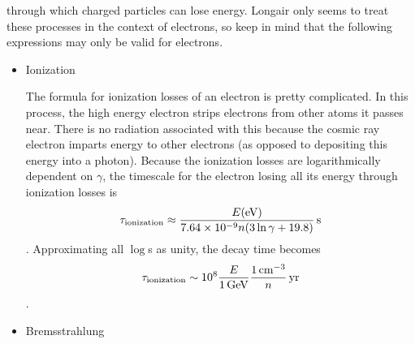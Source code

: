 \begin{enumerate}
       through which charged particles can lose energy.
      Longair only seems to treat these processes in the context of electrons, so keep in mind
      that the following expressions may only be valid for electrons.
      \begin{itemize}
      \item Ionization

            The formula for ionization losses of an electron is pretty complicated.  In this process, the high energy electron strips electrons from other atoms it passes
            near.  There is no radiation associated with this because the cosmic ray electron
            imparts energy to other electrons (as opposed to depositing this energy into
            a photon).  Because the ionization losses are logarithmically dependent on $\gamma$,
            the timescale for the electron losing all its energy through ionization losses is
            \begin{dmath}
                \tau_{\rm ionization} \approx \frac{E(\rm eV)}{7.64\times10^{-9}n(3\ln\gamma+19.8)}\,{\rm s}
            \end{dmath}.
            Approximating all $\log$s as unity, the decay time becomes
            \begin{dmath}
                \tau_{\rm ionization} \sim 10^8 \frac{E}{1\,{\rm GeV}}\frac{1\,{\rm cm}^{-3}}{n}\,{\rm yr}
            \end{dmath}.

      \item Bremsstrahlung


\end{itemize}
\end{enumerate}
